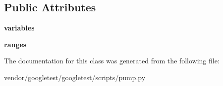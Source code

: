 \subsection*{Public Attributes}
\begin{DoxyCompactItemize}
\item 
{\bfseries variables}\hypertarget{classpump_1_1Env_aba6456f3d0d23ac92bc9508c1b966bcd}{}\label{classpump_1_1Env_aba6456f3d0d23ac92bc9508c1b966bcd}

\item 
{\bfseries ranges}\hypertarget{classpump_1_1Env_a8d5fec087c1a9108de9b105922b34309}{}\label{classpump_1_1Env_a8d5fec087c1a9108de9b105922b34309}

\end{DoxyCompactItemize}


The documentation for this class was generated from the following file\+:\begin{DoxyCompactItemize}
\item 
vendor/googletest/googletest/scripts/pump.\+py\end{DoxyCompactItemize}
